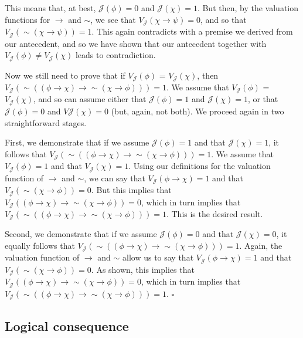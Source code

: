 \documentclass[sloppy, journal, git, bytitle]{humapap}
\begin{document}
This means that, at best, $\mathcal{J}(\phi)=0$ and $\mathcal{J}(\chi)=1$. 
But then, by the valuation functions for $\rightarrow$ and $\sim$, we see that $V\mathcal{_J}(\chi\rightarrow\psi)=0$, 
and so that $V\mathcal{_J}(\sim(\chi\rightarrow\psi))=1$. 
This again contradicts with a premise we derived from our antecedent, and so we have shown that our antecedent together with $V\mathcal{_J}(\phi) \neq  V\mathcal{_J}(\chi)$ leads to contradiction.

Now we still need to prove that if $V\mathcal{_J}(\phi)$ = $V\mathcal{_J}(\chi)$, then $V\mathcal{_J}(\sim((\phi\rightarrow\chi)\rightarrow\sim(\chi\rightarrow\phi)))=1$. We assume that $V\mathcal{_J}(\phi)$ = $V\mathcal{_J}(\chi)$, and so can assume either that $\mathcal{J}(\phi)=1$ and $\mathcal{J}(\chi)=1$, or that $\mathcal{J}(\phi)=0$ and $V\mathcal{J}(\chi)=0$ (but, again, not both). We proceed again in two straightforward stages.

First, we demonstrate that if we assume $\mathcal{J}(\phi)=1$ and that $\mathcal{J}(\chi)=1$, it follows that $V\mathcal{_J}(\sim((\phi\rightarrow\chi)\rightarrow\sim(\chi\rightarrow\phi)))=1$. We assume that $V\mathcal{_J}(\phi)=1$ and that $V\mathcal{_J}(\chi)=1$. Using our definitions for the valuation function of $\rightarrow$ and $\sim$, we can say that $V\mathcal{_J}(\phi\rightarrow\chi)=1$ and that $V\mathcal{_J}(\sim(\chi\rightarrow\phi))=0$. But this implies that $V\mathcal{_J}((\phi\rightarrow\chi)\rightarrow\sim(\chi\rightarrow\phi))=0$, which in turn implies that $V\mathcal{_J}(\sim((\phi\rightarrow\chi)\rightarrow\sim(\chi\rightarrow\phi)))=1$. This is the desired result. 

Second, we demonstrate that if we assume $\mathcal{J}(\phi)=0$ and that $\mathcal{J}(\chi)=0$, it equally follows that $V\mathcal{_J}(\sim((\phi\rightarrow\chi)\rightarrow\sim(\chi\rightarrow\phi)))=1$. Again, the valuation function of $\rightarrow$ and $\sim$ allow us to say that $V\mathcal{_J}(\phi\rightarrow\chi)=1$ and that $V\mathcal{_J}(\sim(\chi\rightarrow\phi))=0$. As shown, this implies that $V\mathcal{_J}((\phi\rightarrow\chi)\rightarrow\sim(\chi\rightarrow\phi))=0$, which in turn implies that $V\mathcal{_J}(\sim((\phi\rightarrow\chi)\rightarrow\sim(\chi\rightarrow\phi)))=1$. $\square$

\subsection{Logical consequence}
\end{document}
